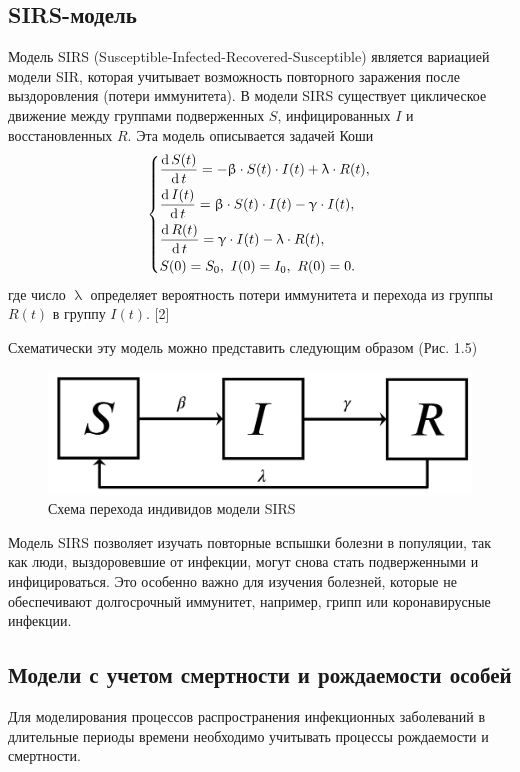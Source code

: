 \documentclass[a4paper, 14pt]{extreport}
\renewcommand{\beta}{\upbeta}
\renewcommand{\gamma}{\upgamma}
\renewcommand{\lambda}{\uplambda}
\renewcommand{\d}{\operatorname{d}}
\begin{document}
	\subsection{SIRS-модель}
	Модель SIRS (Susceptible-Infected-Recovered-Susceptible) является вариацией модели SIR, которая учитывает возможность повторного заражения после выздоровления (потери иммунитета). В модели SIRS существует циклическое движение между группами подверженных $S$, инфицированных $I$ и восстановленных $R$. Эта модель описывается задачей Коши
	\begin{equation}
	\begin{dcases}
		\dfrac {\d S(t)}{\d t} = -\beta \cdot S(t) \cdot I(t) + \lambda \cdot R(t),\\
		\dfrac{\d I(t)}{\d t} = \beta \cdot S(t)\cdot I(t) - \gamma\cdot I(t),\\
		\dfrac{\d R(t)}{\d t} = \gamma\cdot I(t) - \lambda \cdot R(t),\\
		S(0) = S_0,\ I(0) = I_0,\ R(0) = 0.
	\end{dcases}
	\end{equation}
	где число $\lambda$ определяет вероятность потери иммунитета и перехода из группы $R(t)$ в группу $I(t)$. [2]
	
	Схематически эту модель можно представить следующим образом (Рис. 1.5)
	\begin{figure}[h]
		\centering
		\includegraphics[scale=0.25]{images/img07}
		\caption{Схема перехода индивидов модели SIRS}
		\label{fig:img07}
	\end{figure}
	
	Модель SIRS позволяет изучать повторные вспышки болезни в популяции, так как люди, выздоровевшие от инфекции, могут снова стать подверженными и инфицироваться. Это особенно важно для изучения болезней, которые не обеспечивают долгосрочный иммунитет, например, грипп или коронавирусные инфекции.
	
	\subsection{Модели с учетом смертности и рождаемости особей}
	Для моделирования процессов распространения инфекционных заболеваний в длительные периоды времени необходимо учитывать процессы рождаемости и смертности.
	
\end{document}
